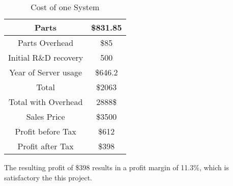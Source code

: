 \documentclass[PPFS.tex]{template/subfiles}
\begin{document}
        \begin{table}[h!]
        	\begin{center}
        		\caption{Cost of one System}
        		\begin{tabular}{|c|c|}
        			\hline
        			Parts & \$831.85\\
        			\hline
        			Parts Overhead & \$85\\
        			\hline
        			Initial R\&D recovery & 500\\
        			\hline
        			Year of Server usage & \$646.2\\
        			\hline
        			Total & \$2063\\
        			\hline
        			Total with Overhead & 2888\$\\
        			\hline
        			Sales Price& \$3500\\
        			\hline
        			Profit before Tax& \$612\\
        			\hline
        			Profit after Tax& \$398\\
        			\hline
        		\end{tabular}
        	\end{center}
        \end{table}
        
        The resulting profit of \$398 results in a profit margin of 11.3\%, which is satisfactory the this project.
        
        
\end{document}
